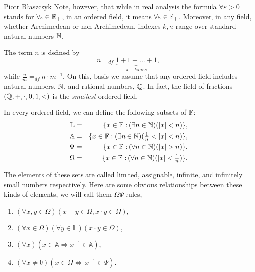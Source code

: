 \begin{artengenv}{Piotr Błaszczyk}
Note, however,  that while in real analysis the formula $\forall \varepsilon>0$
stands for $\forall \varepsilon\in{\mathbb{R}}_+$, in an ordered field,  it means
$\forall \varepsilon\in{\mathbb{F}}_+$. Moreover, in any field, whether Archimedean or non-Archimedean, indexes $k, n$ range over standard natural numbers ${\mathbb{N}}$. 

 The term $n$ is defined by
\[n=_{df}\underbrace{1 +1 + ... + 1}_{n - times},\]
while $\frac nm=_{df} n\cdot m^{-1}$. On this, basis we assume that any ordered field includes natural numbers, ${\mathbb{N}}$, and rational numbers, ${\mathbb{Q}}$. In fact, the field of fractions $({\mathbb{Q}},+,\cdot,0,1,<)$ is the \textit{smallest} ordered field.

In every ordered field, we can define the following subsets of ${\mathbb{F}}$:
\begin{eqnarray*}
 \mathbb L &= & \{x\in \F: (\exists n\in \N)(|x|<n)\},\\
 \mathbb A &=&   \{x\in \F: (\exists n\in \N)(\tfrac 1 n<|x|<n)\},\\
 \Psi             &=& \{x\in \F: (\forall n\in \N)(|x|>n)\},\\
 \Omega      &=& \{x\in \F: (\forall n\in \N)(|x|<\tfrac 1n)\}.
 \end{eqnarray*}

 The elements of these sets are called  limited, assignable,   infinite, and infinitely small numbers respectively.
Here are some obvious relationships between these kinds  of elements, we will call them $\Omega\Psi$ rules,
\begin{enumerate}\itemsep 0mm
\item[] $(\forall x, y\in\Omega)( x+y\in\Omega, x\cdot y\in\Omega)$,
\item[]  $(\forall x\in\Omega)( \forall y\in\mathbb L)( x\cdot y\in\Omega)$,
\item[] $(\forall x)(x\in \mathbb A\Rightarrow  x^{-1}\in\mathbb A)$,
\item[] $(\forall x\neq 0)(x\in\Omega  \Leftrightarrow \ x^{-1}\in\Psi)$.
\end{enumerate}



\end{artengenv}
